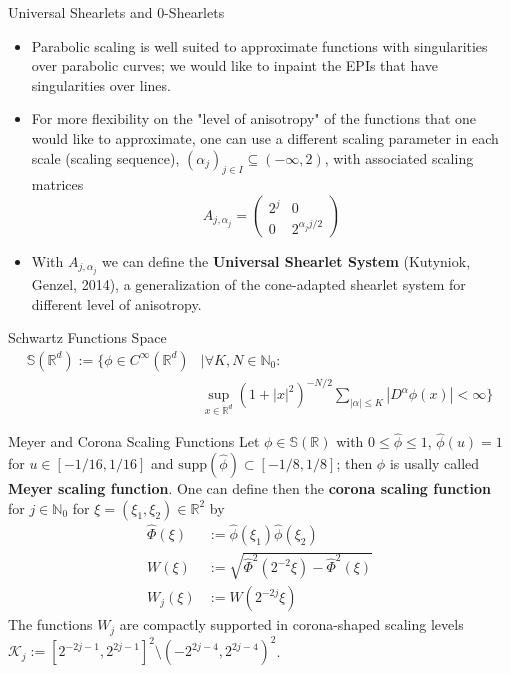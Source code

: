 \begin{frame}{Universal Shearlets and $0$-Shearlets}
\begin{block}{}
\begin{itemize}
\item Parabolic scaling is well suited to approximate functions with singularities over parabolic curves; we would like to inpaint the EPIs that have singularities over lines.
\pause
\item For more flexibility on the "level of anisotropy" of the functions that one would like to approximate, one can use a different scaling parameter in each scale (scaling sequence), $(\alpha_j)_{j\in I}\subseteq (-\infty,2)$, with associated scaling matrices 
$$
A_{j,\alpha_j} = \left( \begin{matrix} 2^j & 0 \\ 0 & 2^{\alpha_j j/2}\end{matrix}\right)
$$
\pause 
\item With $A_{j,\alpha_j}$ we can define the \textbf{Universal Shearlet System} (Kutyniok, Genzel, 2014), a generalization of the cone-adapted shearlet system for different level of anisotropy.
\end{itemize}
\end{block}
\end{frame}

\begin{frame}
\begin{block}{Schwartz Functions Space}
$$
\begin{aligned}
\mathbb{S}(\mathbb{R}^d):=\{\phi\in C^{\infty}(\mathbb{R}^d)&|\forall K,N\in\mathbb{N}_0:\\
&\sup_{x\in\mathbb{R}^d}(1+|x|^2)^{-N/2}\sum_{|\alpha|\leq K}|D^{\alpha}\phi(x)|<\infty\}
\end{aligned}
$$
\end{block}

\pause
\begin{block}{Meyer and Corona Scaling Functions}
Let $\phi\in\mathbb{S}(\mathbb{R})$ with $0\leq \hat{\phi}\leq 1$, $\hat{\phi}(u)=1$ for $u\in [-1/16,1/16]$ and $\text{supp}(\hat{\phi})\subset [-1/8,1/8]$; then $\phi$ is usally called \textbf{Meyer scaling function}. One can define then the \textbf{corona scaling function} for $j\in\mathbb{N}_0$ for $\xi = (\xi_1,\xi_2)\in \mathbb{R}^2$ by
$$
\begin{aligned}
\hat{\Phi}(\xi)&:= \hat{\phi}(\xi_1)\hat{\phi}(\xi_2)\\
W(\xi)&:= \sqrt{\hat{\Phi}^2(2^{-2}\xi)-\hat{\Phi}^2(\xi)}\\
W_j(\xi)&:= W(2^{-2j}\xi)
\end{aligned}
$$
The functions $W_j$ are compactly supported in corona-shaped scaling levels $\mathcal{K}_j:=[2^{-2j-1},2^{2j-1}]^2\setminus (-2^{2j-4},2^{2j-4})^2$.

\end{block}
\end{frame}

